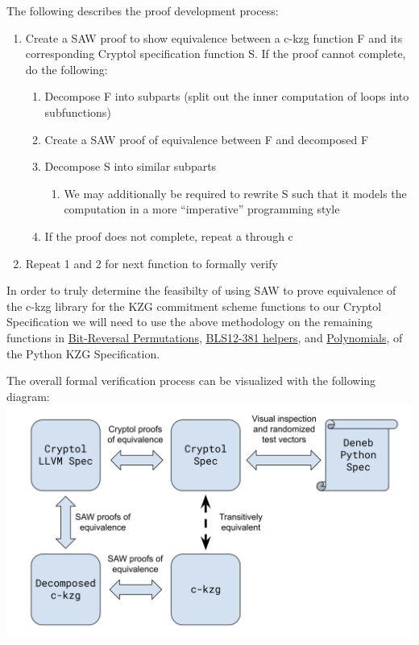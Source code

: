\documentclass[12pt]{galois-whitepaper}
\begin{document}
The following describes the proof development process:
\begin{enumerate}
    \item Create a SAW proof to show equivalence between a c-kzg function F and its corresponding Cryptol specification function S.
          If the proof cannot complete, do the following:
          \begin{enumerate}
                \item Decompose F into subparts (split out the inner computation of loops into subfunctions)
                \item Create a SAW proof of equivalence between F and decomposed F
                \item Decompose S into similar subparts
                      \begin{enumerate}
                        \item We may additionally be required to rewrite S such that it models the computation in a more “imperative” programming style
                      \end{enumerate}
                \item If the proof does not complete, repeat a through c
          \end{enumerate}
    \item Repeat 1 and 2 for next function to formally verify
\end{enumerate}

In order to truly determine the feasibilty of using SAW to prove equivalence of the c-kzg library for the KZG commitment
scheme functions to our Cryptol Specification we will need to use the above methodology on the remaining functions in
\href{https://github.com/ethereum/consensus-specs/blob/dev/specs/deneb/polynomial-commitments.md\#bit-reversal-permutation}{Bit-Reversal Permutations},
\href{https://github.com/ethereum/consensus-specs/blob/dev/specs/deneb/polynomial-commitments.md\#bls12-381-helpers}{BLS12-381 helpers},
and \href{https://github.com/ethereum/consensus-specs/blob/dev/specs/deneb/polynomial-commitments.md#polynomials}{Polynomials},
of the Python KZG Specification.

The overall formal verification process can be visualized with the following diagram:
\includegraphics[width=\textwidth]{Proof-Equivalence-Diagram.png}
\end{document}
